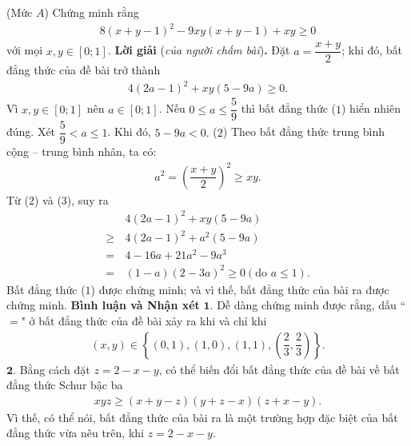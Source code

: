\begin{multicols}{2}
\begin{flushright}
	\end{flushright}
	{}
	(Mức $A$) Chứng minh rằng
	\begin{align*}
		8(x+y-1)^2-9xy(x+y-1)+xy\ge0
	\end{align*}
	với mọi $x,y\in[0;1]$. 
	\vskip 0.05cm
	\textbf{\color{thachthuctoanhoc}Lời giải} (\textit{của người chấm bài})\textbf{\color{thachthuctoanhoc}.}
	\vskip 0.05cm
	Đặt $a = \dfrac{x + y}{2}$; khi đó, bất đẳng thức của đề bài trở thành
	\begin{align*}
		4{\left( {2a - 1} \right)^2} + xy\left( {5 - 9a} \right) \ge 0. \tag{$1$}
	\end{align*}
	Vì $x, y \in [0; 1]$ nên $a \in [0; 1]$.
	\vskip 0.05cm
	Nếu  $0 \le a \le \dfrac{5}{9}$ thì bất đẳng thức ($1$) hiển nhiên đúng.
	\vskip 0.05cm
	Xét $\dfrac{5}{9} < a \le 1$.
	\vskip 0.05cm  
	Khi đó, $5 - 9a < 0.$ \hfill ($2$)
	\vskip 0.05cm
	Theo bất đẳng thức trung bình cộng -- trung bình nhân, ta có:
	\begin{align*}
		{a^2} = {\left( {\dfrac{{x + y}}{2}} \right)^2} \ge xy. \tag{$3$}
	\end{align*}
	Từ ($2$) và ($3$), suy ra
	\begin{align*}
			&4{\left( {2a - 1} \right)^2} + xy\left( {5 - 9a} \right) \\
			\ge \,&4{\left( {2a - 1} \right)^2} + {a^2}\left( {5 - 9a} \right)\\
		 = \,&4 - 16a + 21{a^2} - 9{a^3}\\
		= \,&\left( {1 - a} \right){\left( {2 - 3a} \right)^2} \ge 0\left( {{\text{do }}a \le 1} \right).
	\end{align*}
	Bất đẳng thức ($1$) được chứng minh; và vì thế, bất đẳng thức của bài ra được chứng minh.
	\vskip 0.05cm
	\textbf{\color{thachthuctoanhoc}Bình luận và Nhận xét}
	\vskip 0.05cm
	$\pmb{1.}$ Dễ dàng chứng minh được rằng, dấu ``$=$" ở bất đẳng thức của đề bài xảy ra khi và chỉ khi
	\begin{align*}
		\left( {x,y} \right) \in \left\{ {\left( {0,1} \right),\left( {1,0} \right),\left( {1,1} \right),\left( {\dfrac{2}{3},\dfrac{2}{3}} \right)} \right\}.
	\end{align*}
	$\pmb{2.}$ Bằng cách đặt $z = 2 - x - y$, có thể biến đổi bất đẳng thức của đề bài về bất đẳng thức Schur bậc ba
	\begin{align*}
		xyz \ge \left( {x + y - z} \right)\left( {y + z - x} \right)\left( {z + x - y} \right).
	\end{align*}
	Vì thế, có thể nói, bất đẳng thức của bài ra là một trường hợp đặc biệt của bất đẳng thức vừa nêu trên, khi $z = 2 - x - y$.

\end{multicols}
